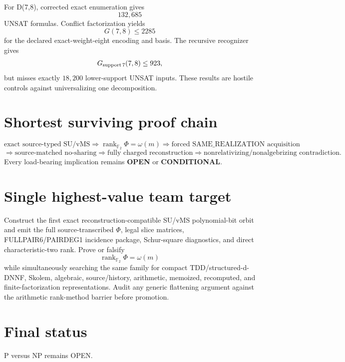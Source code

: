 \documentclass[11pt]{article}
\begin{document}
For D(7,8), corrected exact enumeration gives
\[
132{,}685
\]
UNSAT formulas. Conflict factorization yields
\[
G(7,8)\le2285
\]
for the declared exact-weight-eight encoding and basis. The recursive recognizer gives
\[
G_{\rm support\,7}(7,8)\le923,
\]
but misses exactly \(18{,}200\) lower-support UNSAT inputs. These results are hostile controls against universalizing one decomposition.

\section*{Shortest surviving proof chain}
\[
\text{exact source-typed SU/vMS}
\Longrightarrow
\operatorname{rank}_{\mathbb F_2}\Phi=\omega(m)
\Longrightarrow
\text{forced SAME\_REALIZATION acquisition}
\]
\[
\Longrightarrow
\text{source-matched no-sharing}
\Longrightarrow
\text{fully charged reconstruction}
\Longrightarrow
\text{nonrelativizing/nonalgebrizing contradiction}.
\]
Every load-bearing implication remains \textbf{OPEN} or \textbf{CONDITIONAL}.

\section*{Single highest-value team target}
Construct the first exact reconstruction-compatible SU/vMS polynomial-bit orbit and emit the full source-transcribed \(\Phi\), legal slice matrices, FULLPAIR6/PAIRDEG1 incidence package, Schur-square diagnostics, and direct characteristic-two rank. Prove or falsify
\[
\boxed{\operatorname{rank}_{\mathbb F_2}\Phi=\omega(m)}
\]
while simultaneously searching the same family for compact TDD/structured-d-DNNF, Skolem, algebraic, source/history, arithmetic, memoized, recomputed, and finite-factorization representations. Audit any generic flattening argument against the arithmetic rank-method barrier before promotion.

\section*{Final status}
P versus NP remains OPEN.

\end{document}
